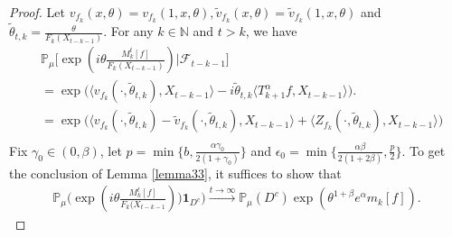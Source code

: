 \documentclass[12pt,oneside,english]{amsart}
\theoremstyle{plain}
\theoremstyle{definition}
\numberwithin{equation}{section}
\begin{document}
 \begin{proof}
     Let $v_{f_k}(x,\theta)=v_{f_k}(1,x,\theta),\tilde{v}_{f_k}(x,\theta)=\tilde{v}_{f_k}(1,x,\theta)$ and $\tilde{\theta}_{t,k}=\frac{\theta}{F_k(X_{t-k-1})}$. For any $k\in\mathbb{N}$ and $t>k$, we have
         \begin{align}
        &\mathbb{P}_{\mu}\big[\exp(i\theta\frac {M_k^t[f]}{F_k(X_{t-k-1})})\big|\mathscr{F}_{t-k-1}\big]\\
        &=\exp\big(\langle v_{f_k}(\cdot,\tilde{\theta}_{t,k}),X_{t-k-1}\rangle-i\tilde{\theta}_{t,k}\langle T_{k+1}^{\alpha}f, X_{t-k-1}\rangle\big).\\
        \label{condition mean}
        &=\exp\big(\langle v_{f_k}(\cdot,\tilde{\theta}_{t,k})-\tilde{v}_{f_k}(\cdot, \tilde{\theta}_{t,k}),X_{t-k-1}\rangle+\langle Z_{f_k}(\cdot,\tilde{\theta}_{t,k}),X_{t-k-1}\rangle\big)\\
       \end{align}
         Fix $\gamma_0\in (0,\beta)$, let $p=\min\{b,\frac{\alpha\gamma_0}{2(1+\gamma_0)}\}$ and $\epsilon_0=\min\{\frac{\alpha\beta}{2(1+2\beta)},\frac{p}{2}\}$.
       To get the conclusion of Lemma \ref{lemma33}, it suffices to show that
       \begin{align}
           \mathbb{P}_{\mu}\Big(\exp(i\theta\frac{M_k^t[f]}{F_k(X_{t-k-1}}))\mathbf{1}_{D^c}\Big)\xrightarrow{t\rightarrow \infty}\mathbb{P}_{\mu}(D^c)\exp(\theta^{1+\beta}e^{\alpha}m_k[f]).
       \end{align}
\end{proof}
\end{document}
